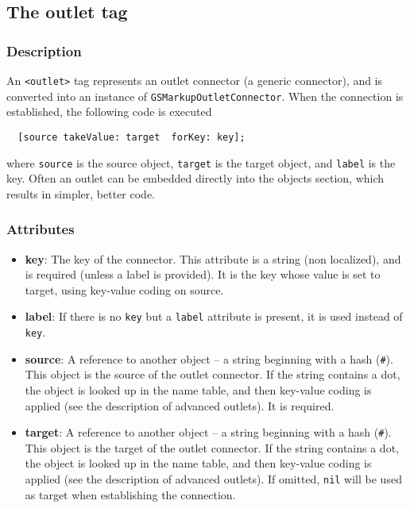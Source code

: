 \subsection{The outlet tag}

\subsubsection{Description}
An \texttt{<outlet>} tag represents an outlet connector (a generic
connector), and is converted into an instance of
\texttt{GSMarkupOutletConnector}.  When the connection is established,
the following code is executed
\begin{verbatim}
  [source takeValue: target  forKey: key];
\end{verbatim}
where \texttt{source} is the source object, \texttt{target} is the
target object, and \texttt{label} is the key.  Often an outlet can be
embedded directly into the objects section, which results in simpler,
better code.

\subsubsection{Attributes}
\begin{itemize}
\item {\bf key}: The key of the connector.  This attribute is a string
  (non localized), and is required (unless a label is provided).  It
  is the key whose value is set to target, using key-value coding on
  source.
\item {\bf label}: If there is no \texttt{key} but a \texttt{label}
  attribute is present, it is used instead of \texttt{key}.
\item {\bf source}: A reference to another object -- a string
  beginning with a hash (\texttt{\#}).  This object is the source of
  the outlet connector.  If the string contains a dot, the object is
  looked up in the name table, and then key-value coding is applied
  (see the description of advanced outlets).  It is required.
\item {\bf target}: A reference to another object -- a string
  beginning with a hash (\texttt{\#}).  This object is the target of
  the outlet connector.  If the string contains a dot, the object is
  looked up in the name table, and then key-value coding is applied
  (see the description of advanced outlets).  If omitted, \texttt{nil}
  will be used as target when establishing the connection.
\end{itemize}

